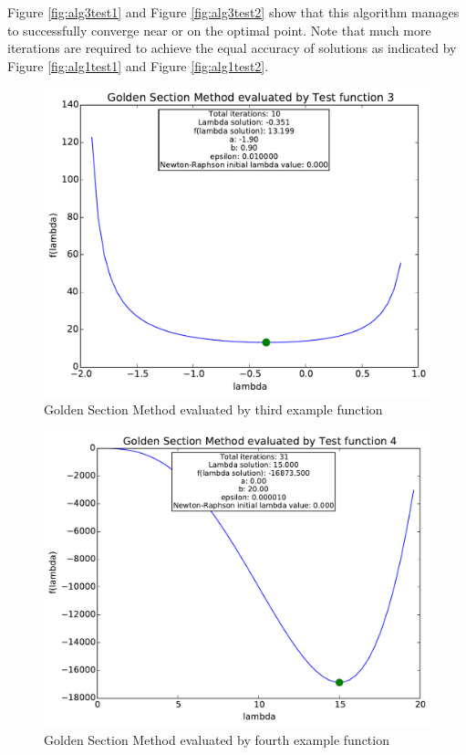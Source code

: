 \documentclass[a4paper,10pt]{article}
\begin{document}
Figure \ref{fig:alg3test1} and Figure \ref{fig:alg3test2} show that this algorithm manages to successfully converge near or on the optimal point. Note that much more iterations are required to achieve the equal accuracy of solutions as indicated by Figure \ref{fig:alg1test1} and Figure \ref{fig:alg1test2}.

\newpage
\begin{figure}[h]
\centering
 \includegraphics[scale=0.55]{./graphs/algorithm3/testFunction3.pdf} 
 \caption{Golden Section Method evaluated by third example function}
 \label{fig:alg3test3}
\end{figure}

\begin{figure}[h]
\centering
 \includegraphics[scale=0.55]{./graphs/algorithm3/testFunction4.pdf} 
 \caption{Golden Section Method evaluated by fourth example function}
 \label{fig:alg3test4}
\end{figure}
\end{document}
